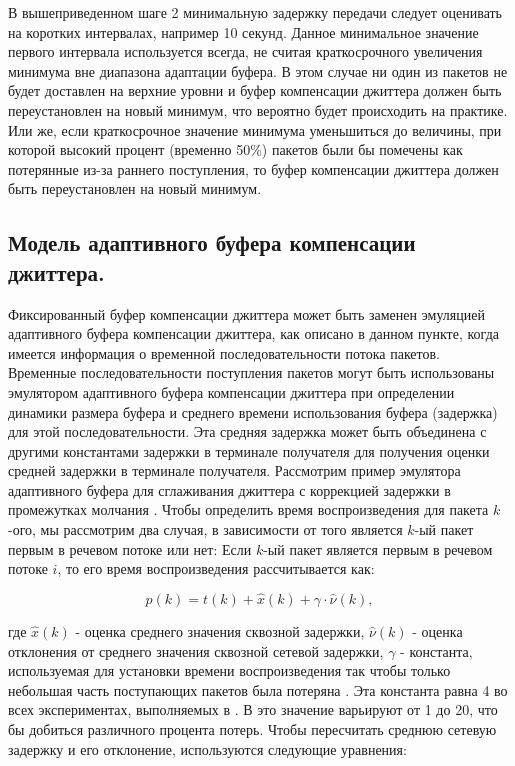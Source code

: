 В вышеприведенном шаге 2 минимальную задержку передачи следует оценивать на коротких интервалах, например 10 секунд. Данное минимальное значение первого интервала используется всегда, не считая краткосрочного увеличения минимума вне диапазона адаптации буфера. В этом случае ни один из пакетов не будет доставлен на верхние уровни и буфер компенсации джиттера должен быть переустановлен на новый минимум, что вероятно будет происходить на практике. Или же, если краткосрочное значение минимума уменьшиться до величины, при которой высокий процент (временно 50\%) пакетов были бы помечены как потерянные из-за раннего поступления, то буфер компенсации джиттера должен быть переустановлен на новый минимум.

\subsection{Модель адаптивного буфера компенсации джиттера.} \label{sect3_4_2}

Фиксированный буфер компенсации джиттера может быть заменен эмуляцией адаптивного буфера компенсации джиттера, как описано в данном пункте, когда имеется информация о временной последовательности потока пакетов. 
Временные последовательности поступления пакетов могут быть использованы эмулятором адаптивного буфера компенсации джиттера при определении динамики размера буфера и среднего времени использования буфера (задержка) для этой последовательности. Эта средняя задержка может быть объединена с другими константами задержки в терминале получателя для получения оценки средней задержки в терминале получателя. 
Рассмотрим пример эмулятора адаптивного буфера для сглаживания джиттера с коррекцией задержки в промежутках молчания \cite{Ramjee}. Чтобы определить время воспроизведения для пакета $k$-ого, мы рассмотрим два случая, в зависимости от того является $k$-ый пакет первым в речевом потоке или нет:
Если $k$-ый пакет является первым в речевом потоке $i$, то его время воспроизведения рассчитывается как:

\begin{equation}\label{eq3:playout}
p(k)=t(k)+\hat{x}(k)+\gamma\cdot\hat{\nu}(k),
\end{equation}

\noindent где $\hat{x}(k)$ - оценка среднего значения сквозной задержки, $\hat{\nu}(k)$ - оценка отклонения от среднего значения сквозной сетевой задержки, $\gamma$ - константа, используемая для установки времени воспроизведения так чтобы только небольшая часть поступающих пакетов была потеряна \cite{Ramjee}. Эта константа равна 4 во всех экспериментах, выполняемых в \cite{Ramjee}. В \cite{Moon} это значение варьируют от 1 до 20, что бы добиться различного процента потерь. Чтобы пересчитать среднюю сетевую задержку и его отклонение, используются следующие уравнения:

